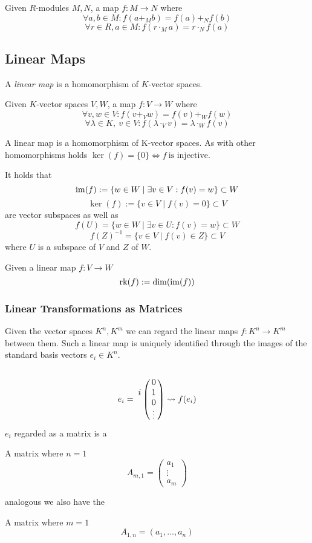 \begin{definition}
   Given \(R\)-modules \(M, N\), a map \(f: M \to N\) where
   \[\forall a, b \in M: f(a +_M b) = f(a) +_N f(b)\]
   \[\forall r \in R, a \in M: f(r \cdot_M a) = r \cdot_N f(a)\]
\end{definition}

\subsection{Linear Maps}
A \emph{linear map} is a homomorphism of \(K\)-vector spaces.

\begin{definition}
   Given \(K\)-vector spaces \(V, W\), a map \(f: V \to W\) where
   \[\forall v, w \in V: f(v +_V w) = f(v) +_W f(w)\]
   \[\forall \lambda \in K,~v \in V: f(\lambda \cdot_V v) = \lambda \cdot_W f(v)\]
\end{definition}
\begin{remark}
   A linear map is a homomorphism of K-vector spaces.
   As with other homomorphisms holds \(\ker(f) = \{0\} \iff f~\text{is injective}\).
\end{remark}
\begin{remark}
   It holds that
   \[\operatorname{im}(f) := \{w \in W \mid \exists v \in V: f(v) = w\} \subset W\]
   \[\ker(f) := \{v \in V \mid f(v) = 0\} \subset V\]
   are vector subspaces as well as
   \[f(U) = \{w \in W \mid \exists v \in U: f(v) = w\} \subset W\]
   \[f(Z)^{-1} = \{v \in V \mid f(v) \in Z\} \subset V\]
   where \(U\) is a subspace of \(V\) and \(Z\) of \(W\).
\end{remark}

\begin{definition}\label{def:linmaprank}
   Given a linear map \(f: V \to W\)
   \[\operatorname{rk}(f) := \dim(\operatorname{im}(f))\]
\end{definition}

\subsubsection{Linear Transformations as Matrices}
Given the vector spaces \(K^n, K^m\) we can regard the linear maps \(f: K^n \to K^m\) between them.
Such a linear map is uniquely identified through the images of the standard basis vectors \(e_i \in K^n\).
\[e_i = \bordermatrix{
      ~ &   \cr
        & 0 \cr
      i & 1 \cr
        & 0 \cr
        & \vdots} \rightsquigarrow f(e_i)\]
\(e_i\) regarded as a matrix is a
\begin{definition}
   A matrix where \(n = 1\)
   \[A_{m,1} = \begin{pmatrix} a_1 \\ \vdots \\ a_m \end{pmatrix}\]
\end{definition}
analogous we also have the
\begin{definition}
   A matrix where \(m = 1\)
   \[A_{1,n} = (a_1, \ldots, a_n)\]
\end{definition}

